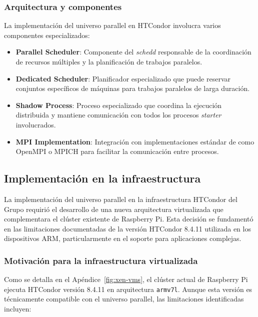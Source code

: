\subsubsection{Arquitectura y componentes}
\noindent

La implementación del universo parallel en HTCondor involucra varios componentes especializados:

\begin{itemize}
	\item \textbf{Parallel Scheduler}: Componente del \textit{schedd} responsable de la coordinación de recursos múltiples y la planificación de trabajos paralelos.
	
	\item \textbf{Dedicated Scheduler}: Planificador especializado que puede reservar conjuntos específicos de máquinas para trabajos paralelos de larga duración.
	
	\item \textbf{Shadow Process}: Proceso especializado que coordina la ejecución distribuida y mantiene comunicación con todos los procesos \textit{starter} involucrados.
	
	\item \textbf{MPI Implementation}: Integración con implementaciones estándar de \MPI como OpenMPI o MPICH para facilitar la comunicación entre procesos.
\end{itemize}

\subsection{Implementación en la infraestructura \GRID}
\noindent

La implementación del universo parallel en la infraestructura HTCondor del Grupo \GRID requirió el desarrollo de una nueva arquitectura virtualizada que complementara el clúster existente de Raspberry Pi. Esta decisión se fundamentó en las limitaciones documentadas de la versión HTCondor 8.4.11 utilizada en los dispositivos ARM, particularmente en el soporte para aplicaciones \MPI complejas.

\subsubsection{Motivación para la infraestructura virtualizada}
\noindent

Como se detalla en el Apéndice~\ref{fig:xen-vms}, el clúster actual de Raspberry Pi ejecuta HTCondor versión 8.4.11 en arquitectura \texttt{armv7l}. Aunque esta versión es técnicamente compatible con el universo parallel, las limitaciones identificadas incluyen:


